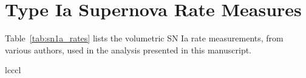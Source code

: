 \documentclass[apj, linenumbers]{aastex62}
\begin{document}
{}

\appendix

\section {Type Ia Supernova Rate Measures}\label{sec:ratemeas}
Table~\ref{tab:sn1a_rates} lists the volumetric SN Ia rate measurements, from various authors, used in the analysis presented in this manuscript.

\startlongtable
\begin{deluxetable}{lcccl}
\label{tab:sn1a_rates}


\end{deluxetable}
\end{document}
